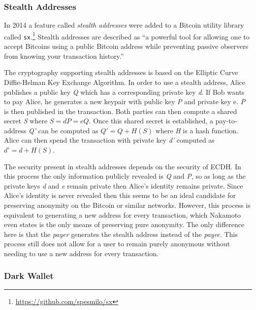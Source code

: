 \documentclass[11pt]{article}
\begin{document}
\subsubsection{Stealth Addresses} In 2014 a feature called \emph{stealth addresses} were added to a Bitcoin utility
library called \texttt{sx}.\footnote{\url{https://github.com/spesmilo/sx}} Stealth addresses are described as ``a
powerful tool for allowing one to accept Bitcoins using a public Bitcoin address while preventing passive observers from
knowing your transaction history.''\cite{stealth}

The cryptography supporting stealth addresses is based on the Elliptic Curve Diffie-Helman Key Exchange Algorithm. In
order to use a stealth address, Alice publishes a public key \emph{Q} which has a corresponding private key \emph{d}. If
Bob wants to pay Alice, he generates a new keypair with public key \emph{P} and private key {e}. \emph{P} is then
published in the transaction. Both parties can then compute a shared secret \emph{S} where $S = dP = eQ$. Once this
shared secret is established, a pay-to-address \emph{Q'} can be computed as $Q' = Q + H(S)$ where \emph{H} is a hash
function. Alice can then spend the transaction with private key \emph{d'} computed as $d' = d + H(S)$.

The security present in stealth addresses depends on the security of ECDH. In this process the only information publicly
revealed is \emph{Q} and \emph{P}, so as long as the private keys \emph{d} and \emph{e} remain private then Alice's
identity remains private. Since Alice's identity is never revealed then this seems to be an ideal candidate for
preserving anonymity on the Bitcoin or similar networks. However, this process is equivalent to generating a new address
for every transaction, which Nakamoto even states is the only means of preserving pure anonymity.\cite{nakamoto08} The
only difference here is that the \emph{payer} generates the stealth address instead of the \emph{payee}. This process
still does not allow for a user to remain purely anonymous without needing to use a new address for every transaction.

\subsubsection{Dark Wallet}


\end{document}
